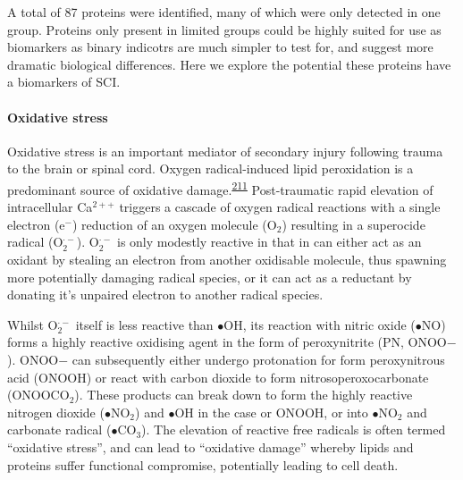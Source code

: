 \documentclass[
]{article}
\begin{document}
A total of 87 proteins were identified, many of which were only detected in one group.
Proteins only present in limited groups could be highly suited for use as biomarkers as binary indicotrs are much simpler to test for, and suggest more dramatic biological differences.
Here we explore the potential these proteins have a biomarkers of SCI.

\hypertarget{oxidative-stress}{%
\paragraph{Oxidative stress}\label{oxidative-stress}}

Oxidative stress is an important mediator of secondary injury following trauma to the brain or spinal cord.
Oxygen radical-induced lipid peroxidation is a predominant source of oxidative damage.\textsuperscript{\protect\hyperlink{ref-hall_lipid_2016}{211}}
Post-traumatic rapid elevation of intracellular Ca\(^{2++}\) triggers a cascade of oxygen radical reactions with a single electron (e\(^{-}\)) reduction of an oxygen molecule (O\(_2\)) resulting in a superocide radical (O\(_2^{\cdot -}\)).
O\(_2^{\cdot -}\) is only modestly reactive in that in can either act as an oxidant by stealing an electron from another oxidisable molecule, thus spawning more potentially damaging radical species, or it can act as a reductant by donating it's unpaired electron to another radical species.

Whilst O\(_2^{\cdot -}\) itself is less reactive than \(\bullet\)OH, its reaction with nitric oxide (\(\bullet\)NO) forms a highly reactive oxidising agent in the form of peroxynitrite (PN, ONOO\(-\)).
ONOO\(-\) can subsequently either undergo protonation for form peroxynitrous acid (ONOOH) or react with carbon dioxide to form nitrosoperoxocarbonate (ONOOCO\(_2\)).
These products can break down to form the highly reactive nitrogen dioxide (\(\bullet\)NO\(_2\)) and \(\bullet\)OH in the case or ONOOH, or into \(\bullet\)NO\(_2\) and carbonate radical (\(\bullet\)CO\(_3\)).
The elevation of reactive free radicals is often termed ``oxidative stress'', and can lead to ``oxidative damage'' whereby lipids and proteins suffer functional compromise, potentially leading to cell death.
\end{document}
